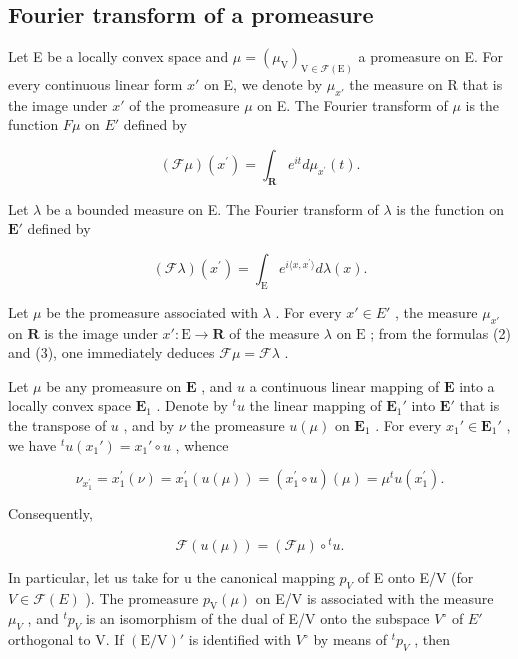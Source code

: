 \subsection{Fourier transform of a promeasure}

Let E be a locally convex space and \(\mu = (\mu_{\mathrm{V}})_{\mathrm{V} \in \mathcal{F}(\mathrm{E})}\) a promeasure on E. For every continuous linear form \(x'\) on E, we denote by \(\mu_{x'}\) the measure on R that is the image under \(x'\) of the promeasure \(\mu\) on E. The Fourier transform of \(\mu\) is the function \(F\mu\) on \(E'\) defined by

\[
(\mathcal {F} \mu) (x ^ {\prime}) = \int_ {\mathbf {R}} e ^ {i t} d \mu_ {x ^ {\prime}} (t).\tag{2}
\]

Let \(\lambda\) be a bounded measure on E. The Fourier transform of \(\lambda\) is the function on \(\mathbf{E}'\) defined by

\[
(\mathcal {F} \lambda) (x ^ {\prime}) = \int_ {\mathrm{E}} e ^ {i \langle x, x ^ {\prime} \rangle} d \lambda (x).\tag{3}
\]

Let \(\mu\) be the promeasure associated with \(\lambda\) . For every \(x' \in E'\) , the measure \(\mu_{x'}\) on \(\mathbf{R}\) is the image under \(x': \mathrm{E} \to \mathbf{R}\) of the measure \(\lambda\) on \(\mathrm{E}\) ; from the formulas (2) and (3), one immediately deduces \(\mathcal{F}\mu = \mathcal{F}\lambda\) .

Let \(\mu\) be any promeasure on \(\mathbf{E}\) , and \(u\) a continuous linear mapping of \(\mathbf{E}\) into a locally convex space \(\mathbf{E}_1\) . Denote by \(^t u\) the linear mapping of \(\mathbf{E}_1'\) into \(\mathbf{E}'\) that is the transpose of \(u\) , and by \(\nu\) the promeasure \(u(\mu)\) on \(\mathbf{E}_1\) . For every \(x_1' \in \mathbf{E}_1'\) , we have \(^t u(x_1') = x_1' \circ u\) , whence

\[
\nu_ {x _ {1} ^ {\prime}} = x _ {1} ^ {\prime} (\nu) = x _ {1} ^ {\prime} (u (\mu)) = \left(x _ {1} ^ {\prime} \circ u\right) (\mu) = \mu^ {t} u \left(x _ {1} ^ {\prime}\right).
\]

Consequently,

\[
\mathscr {F} (u (\mu)) = (\mathscr {F} \mu) \circ {} ^ {t} u.\tag{4}
\]

In particular, let us take for u the canonical mapping \(p_{V}\) of E onto E/V (for \(V \in \mathcal{F}(E)\) ). The promeasure \(p_{\mathrm{V}}(\mu)\) on E/V is associated with the measure \(\mu_{V}\) , and \(^{t}p_{V}\) is an isomorphism of the dual of E/V onto the subspace \(V^{\circ}\) of \(E'\) orthogonal to V. If \((\mathrm{E}/\mathrm{V})'\) is identified with \(V^{\circ}\) by means of \(^{t}p_{V}\) , then

